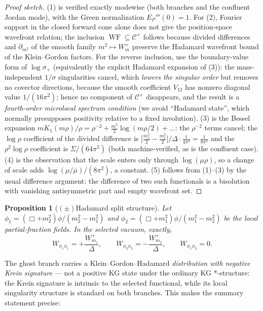 \documentclass[11pt]{article}
\newtheorem{proposition}[theorem]{Proposition}
\theoremstyle{definition}
\theoremstyle{remark}
\newcommand{\WF}{\operatorname{WF}}
\begin{document}
\begin{proof}[Proof sketch]
(1) is verified exactly modewise (both branches and the confluent Jordan
mode), with the Green normalization $E_P'''(0)=1$.  For (2), Fourier
support in the closed forward cone alone does not give the
position-space wavefront relation; the inclusion
$\WF\subseteq\mathcal C^+$ follows because divided differences and
$\partial_{m^2}$ of the smooth family $m^2\mapsto W^+_m$ preserve the
Hadamard wavefront bound of the Klein--Gordon factors.  For the reverse
inclusion, use the boundary-value form of $\log\sigma_+$ (equivalently
the explicit Hadamard expansion of (3)): the mass-independent
$1/\sigma$ singularities cancel, which \emph{lowers the singular order}
but removes no covector directions, because the smooth coefficient
$V_{12}$ has nonzero diagonal value $1/(16\pi^2)$; hence no component of
$\mathcal C^+$ disappears, and the result is a \emph{fourth-order
microlocal spectrum condition} (we avoid ``Hadamard state'', which
normally presupposes positivity relative to a fixed involution).  (3) is
the Bessel expansion
$mK_1(m\rho)/\rho=\rho^{-2}+\tfrac{m^2}{2}\log(m\rho/2)+\dots$: the
$\rho^{-2}$ terms cancel; the $\log\rho$ coefficient of the divided
difference is $\big[\tfrac{m_1^2}{2}-\tfrac{m_2^2}{2}\big]/\Delta\cdot
\tfrac{1}{4\pi^2}=\tfrac{1}{8\pi^2}$ and the $\rho^2\log\rho$
coefficient is $\Sigma/(64\pi^2)$ (both machine-verified, as is the
confluent case).  (4) is the observation that the scale enters only
through $\log(\mu\rho)$, so a change of scale adds
$\log(\mu/\bar\mu)/(8\pi^2)$, a constant.  (5) follows from (1)--(3) by
the usual difference argument: the difference of two such functionals is
a bisolution with vanishing antisymmetric part and empty wavefront set.
\end{proof}

\begin{proposition}[$(\pm)$Hadamard split structure]\label{prop:split}
Let $\phi_1=(\Box+m_2^2)\phi/(m_2^2-m_1^2)$ and
$\phi_2=(\Box+m_1^2)\phi/(m_1^2-m_2^2)$ be the local partial-fraction
fields.  In the selected vacuum, exactly,
\begin{equation}
W_{\phi_1\phi_1}=+\frac{W^+_{m_1}}{\Delta},
\qquad
W_{\phi_2\phi_2}=-\frac{W^+_{m_2}}{\Delta},
\qquad
W_{\phi_1\phi_2}=0 .
\end{equation}
\end{proposition}

The ghost branch carries a Klein--Gordon--Hadamard \emph{distribution
with negative Krein signature} --- not a positive KG state under the
ordinary KG $*$-structure: the Krein signature is intrinsic to the
selected functional, while its local singularity structure is standard on
both branches.  This makes the summary statement precise:
\end{document}
